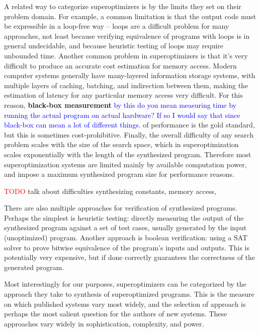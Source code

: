 \documentclass[12pt,twoside]{reedthesis}
\newcommand{\red}[1]{\textcolor{red}{#1}}
\newcommand{\comment}[2]{\textbf{#1} \textcolor{blue}{#2}}
\begin{document}
    A related way to categorize superoptimizers is by the limits they set on their problem domain.
    For example, a common limitation is that the output code must be expressible in a loop-free way
        -- loops are a difficult problem for many approaches,
            not least because verifying equivalence of programs with loops is in general undecidable,
            and because heuristic testing of loops may require unbounded time.
    Another common problem in superoptimizers is that it's very difficult to produce an accurate cost estimation for memory access.
        Modern computer systems generally have many-layered information storage systems, with multiple layers of caching, batching, and indirection between them, making the estimation of latency for any particular memory access very difficult.
        For this reason, \comment{black-box measurement}{by this do you mean measuring time by running the actual program on actual hardware? If so I would say that since black-box can mean a lot of different things.} of performance is the gold standard, but this is sometimes cost-prohibitive.
    Finally, the overall difficulty of any search problem scales with the size of the search space, which in superoptimization scales exponentially with the length of the synthesized program.
        Therefore most superoptimization systems are limited mainly by available computation power, and impose a maximum synthesized program size for performance reasons.
    
    \red{TODO} talk about difficulties synthesizing constants, memory access, %
    
    There are also multiple approaches for verification of synthesized programs.
    Perhaps the simplest is heuristic testing: 
        directly measuring the output of the synthesized program against a set of test cases, usually generated by the input (unoptimized) program.
    Another approach is boolean verification: using a SAT solver to prove bitwise equivalence of the program's inputs and outputs.
    This is potentially very expensive, but if done correctly guarantees the correctness of the generated program. 
    
    Most interestingly for our purposes, superoptimizers can be categorized by the approach they take to synthesis of superoptimized programs.
    This is the measure on which published systems vary most widely, and the selection of approach is perhaps the most salient question for the authors of new systems.
    These approaches vary widely in sophistication, complexity, and power.
    
\end{document}
